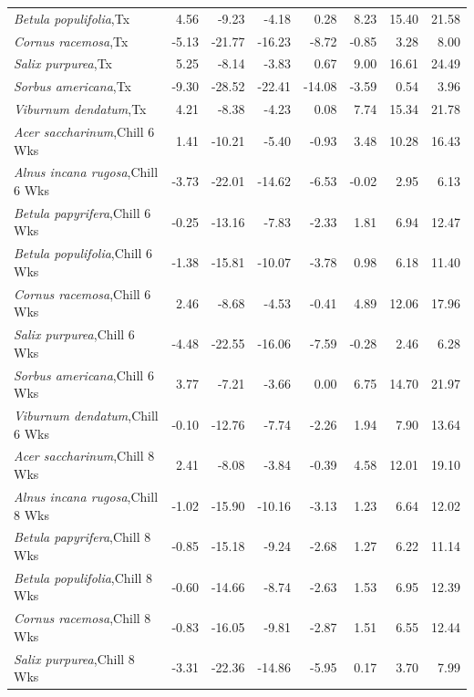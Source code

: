 \documentclass{article}\usepackage[]{graphicx}\usepackage[]{color}
\begin{document}
\begin{longtable}{lrrrrrrr}
  \textit{Betula populifolia},Tx & 4.56 & -9.23 & -4.18 & 0.28 & 8.23 & 15.40 & 21.58 \\ 
  \textit{Cornus racemosa},Tx & -5.13 & -21.77 & -16.23 & -8.72 & -0.85 & 3.28 & 8.00 \\ 
  \textit{Salix purpurea},Tx & 5.25 & -8.14 & -3.83 & 0.67 & 9.00 & 16.61 & 24.49 \\ 
  \textit{Sorbus americana},Tx & -9.30 & -28.52 & -22.41 & -14.08 & -3.59 & 0.54 & 3.96 \\ 
  \textit{Viburnum dendatum},Tx & 4.21 & -8.38 & -4.23 & 0.08 & 7.74 & 15.34 & 21.78 \\ 
  \textit{Acer saccharinum},Chill 6 Wks & 1.41 & -10.21 & -5.40 & -0.93 & 3.48 & 10.28 & 16.43 \\ 
  \textit{Alnus incana rugosa},Chill 6 Wks & -3.73 & -22.01 & -14.62 & -6.53 & -0.02 & 2.95 & 6.13 \\ 
  \textit{Betula papyrifera},Chill 6 Wks & -0.25 & -13.16 & -7.83 & -2.33 & 1.81 & 6.94 & 12.47 \\ 
  \textit{Betula populifolia},Chill 6 Wks & -1.38 & -15.81 & -10.07 & -3.78 & 0.98 & 6.18 & 11.40 \\ 
  \textit{Cornus racemosa},Chill 6 Wks & 2.46 & -8.68 & -4.53 & -0.41 & 4.89 & 12.06 & 17.96 \\ 
  \textit{Salix purpurea},Chill 6 Wks & -4.48 & -22.55 & -16.06 & -7.59 & -0.28 & 2.46 & 6.28 \\ 
  \textit{Sorbus americana},Chill 6 Wks & 3.77 & -7.21 & -3.66 & 0.00 & 6.75 & 14.70 & 21.97 \\ 
  \textit{Viburnum dendatum},Chill 6 Wks & -0.10 & -12.76 & -7.74 & -2.26 & 1.94 & 7.90 & 13.64 \\ 
  \textit{Acer saccharinum},Chill 8 Wks & 2.41 & -8.08 & -3.84 & -0.39 & 4.58 & 12.01 & 19.10 \\ 
  \textit{Alnus incana rugosa},Chill 8 Wks & -1.02 & -15.90 & -10.16 & -3.13 & 1.23 & 6.64 & 12.02 \\ 
  \textit{Betula papyrifera},Chill 8 Wks & -0.85 & -15.18 & -9.24 & -2.68 & 1.27 & 6.22 & 11.14 \\ 
  \textit{Betula populifolia},Chill 8 Wks & -0.60 & -14.66 & -8.74 & -2.63 & 1.53 & 6.95 & 12.39 \\ 
  \textit{Cornus racemosa},Chill 8 Wks & -0.83 & -16.05 & -9.81 & -2.87 & 1.51 & 6.55 & 12.44 \\ 
  \textit{Salix purpurea},Chill 8 Wks & -3.31 & -22.36 & -14.86 & -5.95 & 0.17 & 3.70 & 7.99 \\ 

\end{longtable}
\end{document}
